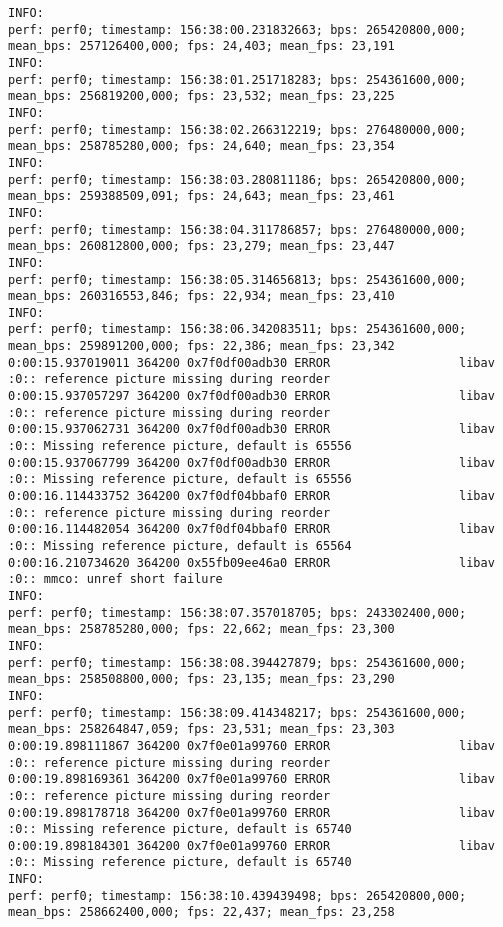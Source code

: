 \documentclass[12pt,oneside]{book}
\begin{document}
\begin{lstlisting}
INFO:
perf: perf0; timestamp: 156:38:00.231832663; bps: 265420800,000; mean_bps: 257126400,000; fps: 24,403; mean_fps: 23,191
INFO:
perf: perf0; timestamp: 156:38:01.251718283; bps: 254361600,000; mean_bps: 256819200,000; fps: 23,532; mean_fps: 23,225
INFO:
perf: perf0; timestamp: 156:38:02.266312219; bps: 276480000,000; mean_bps: 258785280,000; fps: 24,640; mean_fps: 23,354
INFO:
perf: perf0; timestamp: 156:38:03.280811186; bps: 265420800,000; mean_bps: 259388509,091; fps: 24,643; mean_fps: 23,461
INFO:
perf: perf0; timestamp: 156:38:04.311786857; bps: 276480000,000; mean_bps: 260812800,000; fps: 23,279; mean_fps: 23,447
INFO:
perf: perf0; timestamp: 156:38:05.314656813; bps: 254361600,000; mean_bps: 260316553,846; fps: 22,934; mean_fps: 23,410
INFO:
perf: perf0; timestamp: 156:38:06.342083511; bps: 254361600,000; mean_bps: 259891200,000; fps: 22,386; mean_fps: 23,342
0:00:15.937019011 364200 0x7f0df00adb30 ERROR                  libav :0:: reference picture missing during reorder
0:00:15.937057297 364200 0x7f0df00adb30 ERROR                  libav :0:: reference picture missing during reorder
0:00:15.937062731 364200 0x7f0df00adb30 ERROR                  libav :0:: Missing reference picture, default is 65556
0:00:15.937067799 364200 0x7f0df00adb30 ERROR                  libav :0:: Missing reference picture, default is 65556
0:00:16.114433752 364200 0x7f0df04bbaf0 ERROR                  libav :0:: reference picture missing during reorder
0:00:16.114482054 364200 0x7f0df04bbaf0 ERROR                  libav :0:: Missing reference picture, default is 65564
0:00:16.210734620 364200 0x55fb09ee46a0 ERROR                  libav :0:: mmco: unref short failure
INFO:
perf: perf0; timestamp: 156:38:07.357018705; bps: 243302400,000; mean_bps: 258785280,000; fps: 22,662; mean_fps: 23,300
INFO:
perf: perf0; timestamp: 156:38:08.394427879; bps: 254361600,000; mean_bps: 258508800,000; fps: 23,135; mean_fps: 23,290
INFO:
perf: perf0; timestamp: 156:38:09.414348217; bps: 254361600,000; mean_bps: 258264847,059; fps: 23,531; mean_fps: 23,303
0:00:19.898111867 364200 0x7f0e01a99760 ERROR                  libav :0:: reference picture missing during reorder
0:00:19.898169361 364200 0x7f0e01a99760 ERROR                  libav :0:: reference picture missing during reorder
0:00:19.898178718 364200 0x7f0e01a99760 ERROR                  libav :0:: Missing reference picture, default is 65740
0:00:19.898184301 364200 0x7f0e01a99760 ERROR                  libav :0:: Missing reference picture, default is 65740
INFO:
perf: perf0; timestamp: 156:38:10.439439498; bps: 265420800,000; mean_bps: 258662400,000; fps: 22,437; mean_fps: 23,258

\end{lstlisting}
\end{document}
